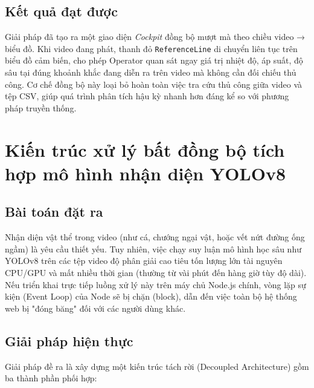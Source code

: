 \documentclass[../DoAn.tex]{subfiles}
\begin{document}
\subsection{Kết quả đạt được}
Giải pháp đã tạo ra một giao diện \textit{Cockpit} đồng bộ mượt mà theo chiều video → biểu đồ. Khi video đang phát, thanh đỏ \texttt{ReferenceLine} di chuyển liên tục trên biểu đồ cảm biến, cho phép Operator quan sát ngay giá trị nhiệt độ, áp suất, độ sâu tại đúng khoảnh khắc đang diễn ra trên video mà không cần đối chiếu thủ công. Cơ chế đồng bộ này loại bỏ hoàn toàn việc tra cứu thủ công giữa video và tệp CSV, giúp quá trình phân tích hậu kỳ nhanh hơn đáng kể so với phương pháp truyền thống.

\section{Kiến trúc xử lý bất đồng bộ tích hợp mô hình nhận diện YOLOv8}
\label{section:5.2}
\subsection{Bài toán đặt ra}
Nhận diện vật thể trong video (như cá, chướng ngại vật, hoặc vết nứt đường ống ngầm) là yêu cầu thiết yếu. Tuy nhiên, việc chạy suy luận mô hình học sâu như YOLOv8 trên các tệp video độ phân giải cao tiêu tốn lượng lớn tài nguyên CPU/GPU và mất nhiều thời gian (thường từ vài phút đến hàng giờ tùy độ dài). Nếu triển khai trực tiếp luồng xử lý này trên máy chủ Node.js chính, vòng lặp sự kiện (Event Loop) của Node sẽ bị chặn (block), dẫn đến việc toàn bộ hệ thống web bị "đóng băng" đối với các người dùng khác.

\subsection{Giải pháp hiện thực}
Giải pháp đề ra là xây dựng một kiến trúc tách rời (Decoupled Architecture) gồm ba thành phần phối hợp:
\end{document}
